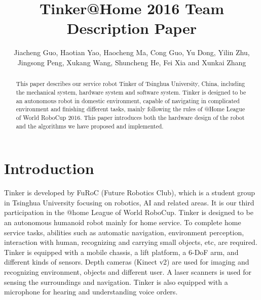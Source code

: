 \documentclass[runningheads,a4paper]{llncs}
\begin{document}
	
\title{Tinker@Home 2016 Team Description Paper}
\author{Jiacheng Guo, Haotian Yao, Haocheng Ma, Cong Guo, Yu Dong, Yilin Zhu, Jingsong Peng, Xukang Wang, Shuncheng He, Fei Xia and Xunkai Zhang}
\maketitle


\begin{abstract}
This paper describes our service robot Tinker of Tsinghua University, China, including the mechanical system, hardware system and software system. Tinker is designed to be an autonomous robot in domestic environment, capable of navigating in complicated environment and finishing different tasks, mainly following the rules of @Home League of World RoboCup 2016. This paper introduces both the hardware design of the robot and the algorithms we have proposed and implemented.
\end{abstract}


\section{Introduction}
Tinker is developed by FuRoC (Future Robotics Club), which is a student group in Tsinghua University focusing on robotics, AI and related areas. It is our third participation in the @home League of World RoboCup. Tinker is designed to be an autonomous humanoid robot mainly for home service. To complete home service tasks, abilities such as automatic navigation, environment perception, interaction with human, recognizing and carrying small objects, etc, are required. Tinker is equipped with a mobile chassis, a lift platform, a 6-DoF arm, and different kinds of sensors. Depth cameras (Kinect v2) are used for imaging and recognizing environment, objects and different user. A laser scanners is used for sensing the surroundings and navigation. Tinker is also equipped with a microphone for hearing and understanding voice orders.
\end{document}
